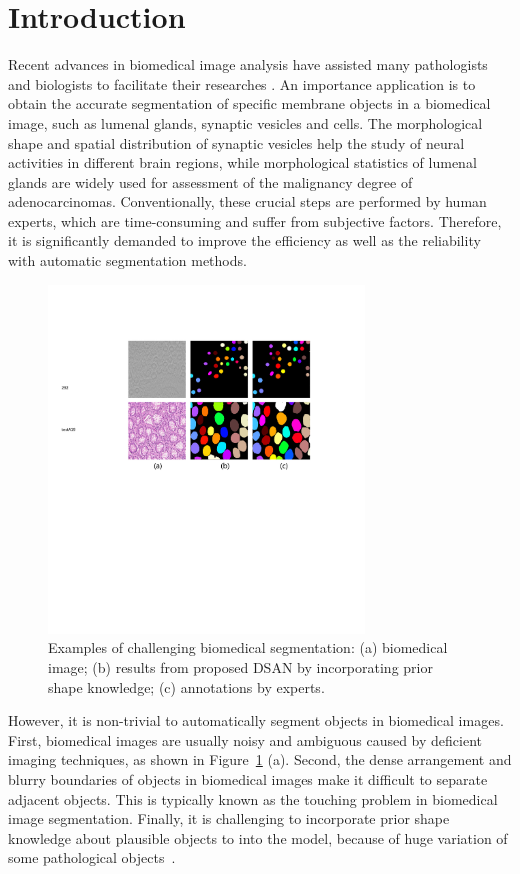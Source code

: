 \section{Introduction}
%

Recent advances in biomedical image analysis have assisted many pathologists and biologists to facilitate their researches \cite{Chen2016b,Ronneberger2015,Chen2016c,Lieman-Sifry2017,Paszke2016,Tseng2017,Sirinukunwattana2015b}.
An importance application is to obtain the accurate segmentation of specific membrane objects in a biomedical image, such as lumenal glands, synaptic vesicles and cells.
%
The morphological shape and spatial distribution of synaptic vesicles help the study of neural activities in different brain regions, while morphological statistics of lumenal glands are widely used for assessment of the malignancy degree of adenocarcinomas.
%
Conventionally, these crucial steps are performed by human experts, which are time-consuming and suffer from subjective factors.
Therefore, it is significantly demanded to improve the efficiency as well as the reliability with automatic segmentation methods.

\begin{figure}
    \begin{center}
        \includegraphics[width=3.3in]{figures/FigImg.pdf}
    \end{center}
    \caption{Examples of challenging biomedical segmentation: (a) biomedical image; (b) results from proposed DSAN by incorporating prior shape knowledge; (c) annotations by experts.}
    \label{fig:introImgs}
\end{figure}

However, it is non-trivial to automatically segment objects in biomedical images.
First, biomedical images are usually noisy and ambiguous caused by deficient imaging techniques, as shown in Figure~\ref{fig:introImgs} (a).
Second, the dense arrangement and blurry boundaries of objects in biomedical images make it difficult to separate adjacent objects. 
This is typically known as the touching problem in biomedical image segmentation.
%
Finally, it is challenging to incorporate prior shape knowledge about plausible objects to into the model, because of huge variation of some pathological objects~\cite{Sirinukunwattana2015b}.
%

